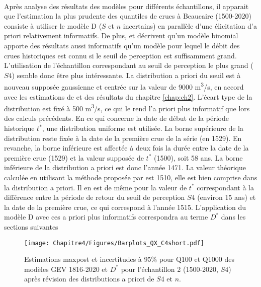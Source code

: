 	\paragraph{} Après analyse des résultats des modèles pour différents échantillons, il apparait que l'estimation la plus prudente des quantiles de crues à Beaucaire (1500-2020) consiste à utiliser le modèle D ($S$ et $n$ incertains) en parallèle d'une élicitation d'a priori relativement informatifs. De plus, \citet{stedinger_flood_1986} et \citet{payrastre_usefulness_2011} décrivent qu'un modèle binomial apporte des résultats aussi informatifs qu'un modèle pour lequel le débit des crues historiques est connu si le seuil de perception est suffisamment grand. L'utilisation de l'échantillon correspondant au seuil de perception le plus grand ($S4$) semble donc être plus intéressante. La distribution a priori du seuil est à nouveau supposée gaussienne et centrée sur la valeur de 9000 m\textsuperscript{3}/s, en accord avec les estimations de \citet{pichard_hydro-climatology_2017} et des résultats du chapitre \ref{chap:ch2}. L'écart type de la distribution est fixé à 500 m\textsuperscript{3}/s, ce qui le rend l'a priori plus informatif que lors des calculs précédents. En ce qui concerne la date de début de la période historique $t^{*}$, une distribution uniforme est utilisée. La borne supérieure de la distribution reste fixée à la date de la première crue de la série (en 1529). En revanche, la borne inférieure est affectée à deux fois la durée entre la date de la première crue (1529) et la valeur supposée de $t^{*}$ (1500), soit 58 ans. La borne inférieure de la distribution a priori est donc l'année 1471. La valeur théorique calculée en utilisant la méthode proposée par \citet{prosdocimi_german_2018} est 1510, elle est bien comprise dans la distribution a priori. Il en est de même pour la valeur de $t^{*}$ correspondant à la différence entre la période de retour du seuil de perception $S4$ (environ 15 ans) et la date de la première crue, ce qui correspond à l'année 1515. L'application du modèle D avec ces a priori plus informatifs correspondra au terme $D^*$ dans les sections suivantes

	\begin{figure}[h]
		\centering
		\texttt{[image: Chapitre4/Figures/Barplots\_QX\_C4short.pdf]}
		\caption{Estimations maxpost et incertitudes à 95\% pour Q100 et Q1000 des modèles GEV 1816-2020 et $D^*$ pour l'échantillon 2 (1500-2020, $S4$) après révision des distributions a priori de $S4$ et $n$.}
		\label{fig:BarplotC4short}
	\end{figure}

